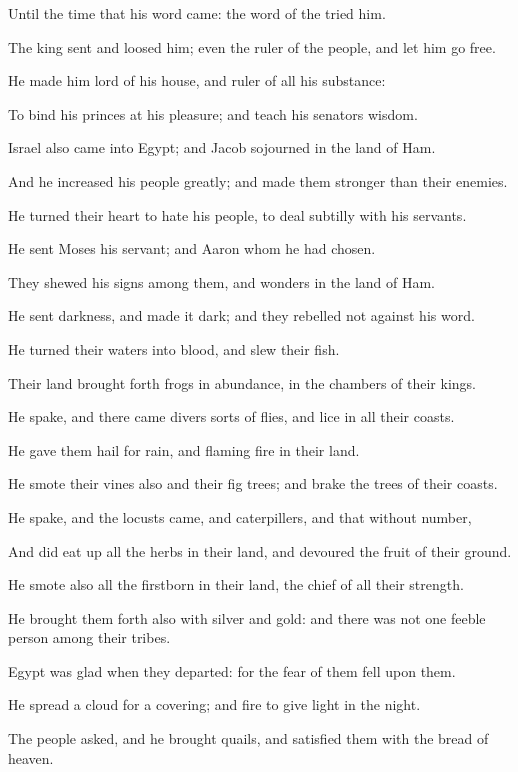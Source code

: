 \Verse Until the time that his word came: the word of the \LORD tried him.

\Verse The king sent and loosed him; even the ruler of the people, and let him go free.

\Verse He made him lord of his house, and ruler of all his substance:

\Verse To bind his princes at his pleasure; and teach his senators wisdom.

\Verse Israel also came into Egypt; and Jacob sojourned in the land of Ham.

\Verse And he increased his people greatly; and made them stronger than their enemies.

\Verse He turned their heart to hate his people, to deal subtilly with his servants.

\Verse He sent Moses his servant; and Aaron whom he had chosen.

\Verse They shewed his signs among them, and wonders in the land of Ham.

\Verse He sent darkness, and made it dark; and they rebelled not against his word.

\Verse He turned their waters into blood, and slew their fish.

\Verse Their land brought forth frogs in abundance, in the chambers of their kings.

\Verse He spake, and there came divers sorts of flies, and lice in all their coasts.

\Verse He gave them hail for rain, and flaming fire in their land.

\Verse He smote their vines also and their fig trees; and brake the trees of their coasts.

\Verse He spake, and the locusts came, and caterpillers, and that without number,

\Verse And did eat up all the herbs in their land, and devoured the fruit of their ground.

\Verse He smote also all the firstborn in their land, the chief of all their strength.

\Verse He brought them forth also with silver and gold: and there was not one feeble person among their tribes.

\Verse Egypt was glad when they departed: for the fear of them fell upon them.

\Verse He spread a cloud for a covering; and fire to give light in the night.

\Verse The people asked, and he brought quails, and satisfied them with the bread of heaven.

